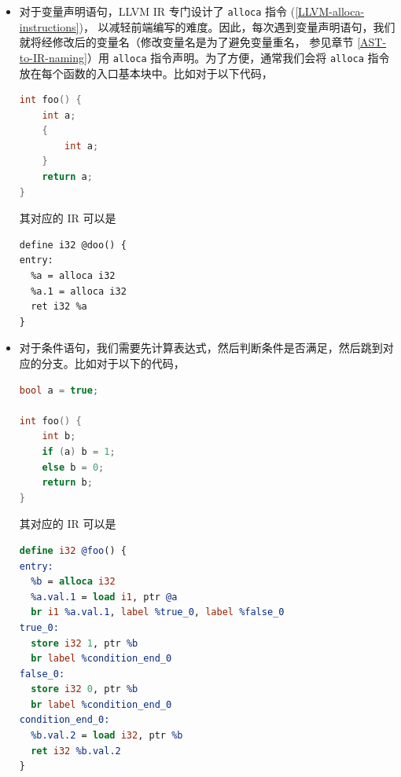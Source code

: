\begin{itemize}
\item 对于变量声明语句，LLVM IR 专门设计了 \texttt{alloca} 指令 (\ref{LLVM-alloca-instructions})，
以减轻前端编写的难度。因此，每次遇到变量声明语句，我们就将经修改后的变量名（修改变量名是为了避免变量重名，
参见章节 \ref{AST-to-IR-naming}）用 \texttt{alloca} 指令声明。为了方便，通常我们会将
\texttt{alloca} 指令放在每个函数的入口基本块中。比如对于以下代码，
\begin{lstlisting}[language=C++]
int foo() {
    int a;
    {
        int a;
    }
    return a;
}
\end{lstlisting}
其对应的 IR 可以是
\begin{lstlisting}
define i32 @doo() {
entry:
  %a = alloca i32
  %a.1 = alloca i32
  ret i32 %a
}
\end{lstlisting}

\item 对于条件语句，我们需要先计算表达式，然后判断条件是否满足，然后跳到对应的分支。比如对于以下的代码，
\begin{lstlisting}[language=C++]
bool a = true;

int foo() {
    int b;
    if (a) b = 1;
    else b = 0;
    return b;
}
\end{lstlisting}
其对应的 IR 可以是
\begin{lstlisting}[language=LLVM]
define i32 @foo() {
entry:
  %b = alloca i32
  %a.val.1 = load i1, ptr @a
  br i1 %a.val.1, label %true_0, label %false_0
true_0:
  store i32 1, ptr %b
  br label %condition_end_0
false_0:
  store i32 0, ptr %b
  br label %condition_end_0
condition_end_0:
  %b.val.2 = load i32, ptr %b
  ret i32 %b.val.2
}
\end{lstlisting}


\end{itemize}
